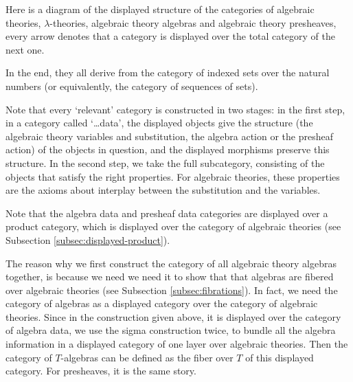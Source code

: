 Here is a diagram of the displayed structure of the categories of algebraic theories, $ \lambda $-theories, algebraic theory algebras and algebraic theory presheaves, every arrow denotes that a category is displayed over the total category of the next one.
\begin{center}
\end{center}
In the end, they all derive from the category of indexed sets over the natural numbers (or equivalently, the category of sequences of sets).

Note that every `relevant' category is constructed in two stages: in the first step, in a category called `\dots data', the displayed objects give the structure (the algebraic theory variables and substitution, the algebra action or the presheaf action) of the objects in question, and the displayed morphisms preserve this structure. In the second step, we take the full subcategory, consisting of the objects that satisfy the right properties. For algebraic theories, these properties are the axioms about interplay between the substitution and the variables.

Note that the algebra data and presheaf data categories are displayed over a product category, which is displayed over the category of algebraic theories (see Subsection \ref{subsec:displayed-product}).

The reason why we first construct the category of all algebraic theory algebras together, is because we need we need it to show that that algebras are fibered over algebraic theories (see Subsection \ref{subsec:fibrations}). In fact, we need the category of algebras as a displayed category over the category of algebraic theories. Since in the construction given above, it is displayed over the category of algebra data, we use the sigma construction twice, to bundle all the algebra information in a displayed category of one layer over algebraic theories. Then the category of $ T $-algebras can be defined as the fiber over $ T $ of this displayed category. For presheaves, it is the same story.

